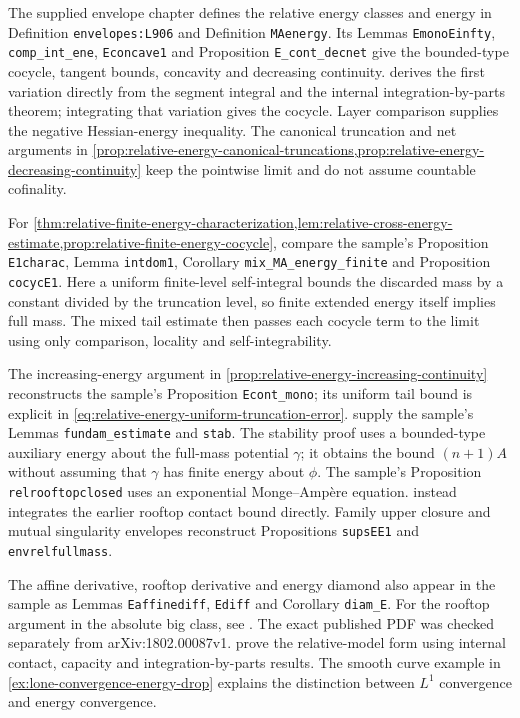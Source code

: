 The supplied envelope chapter \cite{XiaSampleBook} defines the relative energy classes and energy in Definition \texttt{envelopes:L906} and Definition \texttt{MAenergy}. Its Lemmas \texttt{EmonoEinfty}, \texttt{comp\_int\_ene}, \texttt{Econcave1} and Proposition \texttt{E\_cont\_decnet} give the bounded-type cocycle, tangent bounds, concavity and decreasing continuity.  derives the first variation directly from the segment integral and the internal integration-by-parts theorem; integrating that variation gives the cocycle. Layer comparison supplies the negative Hessian-energy inequality. The canonical truncation and net arguments in \cref{prop:relative-energy-canonical-truncations,prop:relative-energy-decreasing-continuity} keep the pointwise limit and do not assume countable cofinality.

For \cref{thm:relative-finite-energy-characterization,lem:relative-cross-energy-estimate,prop:relative-finite-energy-cocycle}, compare the sample's Proposition \texttt{E1charac}, Lemma \texttt{intdom1}, Corollary \texttt{mix\_MA\_energy\_finite} and Proposition \texttt{cocycE1}. Here a uniform finite-level self-integral bounds the discarded mass by a constant divided by the truncation level, so finite extended energy itself implies full mass. The mixed tail estimate then passes each cocycle term to the limit using only comparison, locality and self-integrability.


The increasing-energy argument in \cref{prop:relative-energy-increasing-continuity} reconstructs the sample's Proposition \texttt{Econt\_mono}; its uniform tail bound is explicit in \eqref{eq:relative-energy-uniform-truncation-error}.  supply the sample's Lemmas \texttt{fundam\_estimate} and \texttt{stab}. The stability proof uses a bounded-type auxiliary energy about the full-mass potential $\gamma$; it obtains the bound $(n+1)A$ without assuming that $\gamma$ has finite energy about $\phi$. The sample's Proposition \texttt{relrooftopclosed} uses an exponential Monge--Amp\`ere equation.  instead integrates the earlier rooftop contact bound directly. Family upper closure and mutual singularity envelopes reconstruct Propositions \texttt{supsEE1} and \texttt{envrelfullmass}.

The affine derivative, rooftop derivative and energy diamond also appear in the sample as Lemmas \texttt{Eaffinediff}, \texttt{Ediff} and Corollary \texttt{diam\_E}. For the rooftop argument in the absolute big class, see \cite[Proposition 3.2, Corollary 3.3 and Proposition 3.4, pp.~3067--3069]{DDNL18big}. The exact published PDF was checked separately from arXiv:1802.00087v1.  prove the relative-model form using internal contact, capacity and integration-by-parts results. The smooth curve example in \cref{ex:lone-convergence-energy-drop} explains the distinction between $L^1$ convergence and energy convergence.


